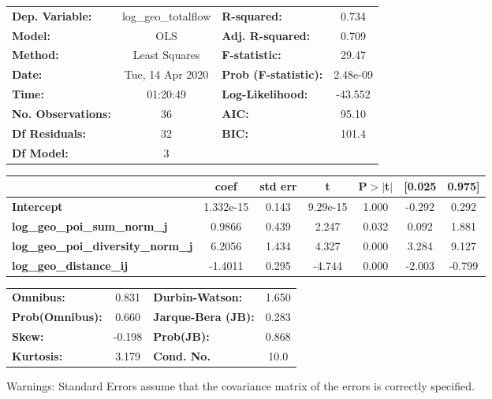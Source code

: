 \begin{center}
\begin{tabular}{lclc}
\toprule
\textbf{Dep. Variable:}                    & log\_geo\_totalflow & \textbf{  R-squared:         } &     0.734   \\
\textbf{Model:}                            &         OLS         & \textbf{  Adj. R-squared:    } &     0.709   \\
\textbf{Method:}                           &    Least Squares    & \textbf{  F-statistic:       } &     29.47   \\
\textbf{Date:}                             &   Tue, 14 Apr 2020  & \textbf{  Prob (F-statistic):} &  2.48e-09   \\
\textbf{Time:}                             &       01:20:49      & \textbf{  Log-Likelihood:    } &   -43.552   \\
\textbf{No. Observations:}                 &            36       & \textbf{  AIC:               } &     95.10   \\
\textbf{Df Residuals:}                     &            32       & \textbf{  BIC:               } &     101.4   \\
\textbf{Df Model:}                         &             3       & \textbf{                     } &             \\
\bottomrule
\end{tabular}
\begin{tabular}{lcccccc}
                                           & \textbf{coef} & \textbf{std err} & \textbf{t} & \textbf{P$> |$t$|$} & \textbf{[0.025} & \textbf{0.975]}  \\
\midrule
\textbf{Intercept}                         &    1.332e-15  &        0.143     &  9.29e-15  &         1.000        &       -0.292    &        0.292     \\
\textbf{log\_geo\_poi\_sum\_norm\_j}       &       0.9866  &        0.439     &     2.247  &         0.032        &        0.092    &        1.881     \\
\textbf{log\_geo\_poi\_diversity\_norm\_j} &       6.2056  &        1.434     &     4.327  &         0.000        &        3.284    &        9.127     \\
\textbf{log\_geo\_distance\_ij}            &      -1.4011  &        0.295     &    -4.744  &         0.000        &       -2.003    &       -0.799     \\
\bottomrule
\end{tabular}
\begin{tabular}{lclc}
\textbf{Omnibus:}       &  0.831 & \textbf{  Durbin-Watson:     } &    1.650  \\
\textbf{Prob(Omnibus):} &  0.660 & \textbf{  Jarque-Bera (JB):  } &    0.283  \\
\textbf{Skew:}          & -0.198 & \textbf{  Prob(JB):          } &    0.868  \\
\textbf{Kurtosis:}      &  3.179 & \textbf{  Cond. No.          } &     10.0  \\
\bottomrule
\end{tabular}
\end{center}

Warnings: \newline
 [1] Standard Errors assume that the covariance matrix of the errors is correctly specified.
